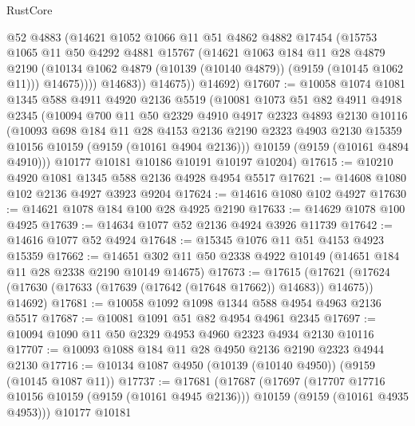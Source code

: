 \begin{lexlean}{RustCore}
\begin{coremodule}
                @52
                @4883
                (@14621
                  @1052
                  @1066
                  @11
                  @51
                  @4862
                  @4882
                  @17454
                  (@15753
                    @1065
                    @11
                    @50
                    @4292
                    @4881
                    @15767
                    (@14621
                      @1063
                      @184
                      @11
                      @28
                      @4879
                      @2190
                      (@10134 @1062 @4879 (@10139 (@10140 @4879)) (@9159 (@10145 @1062 @11)))
                      @14675))))
              @14683))
          @14675))
      @14692)
@17607 := @10058
    @1074
    @1081
    @1345
    @588
    @4911
    @4920
    @2136
    @5519
    (@10081
      @1073
      @51
      @82
      @4911
      @4918
      @2345
      (@10094
        @700
        @11
        @50
        @2329
        @4910
        @4917
        @2323
        @4893
        @2130
        @10116
        (@10093
          @698
          @184
          @11
          @28
          @4153
          @2136
          @2190
          @2323
          @4903
          @2130
          @15359
          @10156
          @10159
          (@9159 (@10161 @4904 @2136)))
        @10159
        (@9159 (@10161 @4894 @4910)))
      @10177
      @10181
      @10186
      @10191
      @10197
      @10204)
@17615 := @10210 @4920 @1081 @1345 @588 @2136 @4928 @4954 @5517
@17621 := @14608 @1080 @102 @2136 @4927 @3923 @9204
@17624 := @14616 @1080 @102 @4927
@17630 := @14621 @1078 @184 @100 @28 @4925 @2190
@17633 := @14629 @1078 @100 @4925
@17639 := @14634 @1077 @52 @2136 @4924 @3926 @11739
@17642 := @14616 @1077 @52 @4924
@17648 := @15345 @1076 @11 @51 @4153 @4923 @15359
@17662 := @14651 @302 @11 @50 @2338 @4922 @10149 (@14651 @184 @11 @28 @2338 @2190 @10149 @14675)
@17673 := @17615
    (@17621 (@17624 (@17630 (@17633 (@17639 (@17642 (@17648 @17662)) @14683)) @14675)) @14692)
@17681 := @10058 @1092 @1098 @1344 @588 @4954 @4963 @2136 @5517
@17687 := @10081 @1091 @51 @82 @4954 @4961 @2345
@17697 := @10094 @1090 @11 @50 @2329 @4953 @4960 @2323 @4934 @2130 @10116
@17707 := @10093 @1088 @184 @11 @28 @4950 @2136 @2190 @2323 @4944 @2130
@17716 := @10134 @1087 @4950 (@10139 (@10140 @4950)) (@9159 (@10145 @1087 @11))
@17737 := @17681
    (@17687
      (@17697
        (@17707 @17716 @10156 @10159 (@9159 (@10161 @4945 @2136)))
        @10159
        (@9159 (@10161 @4935 @4953)))
      @10177
      @10181

\end{coremodule}
\end{lexlean}
